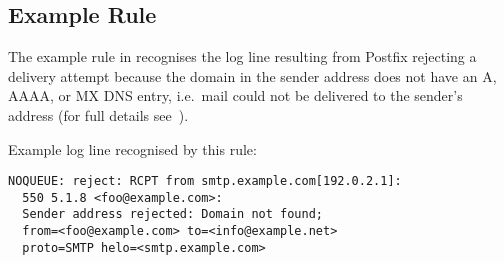 \subsection{Example Rule}

\label{example rule in implementation}

The example rule in 
recognises the log line resulting from Postfix rejecting a delivery attempt
because the domain in the sender address does not have an A, AAAA,
or MX DNS entry, i.e.\ mail could not be delivered to the sender's address
(for full details see~\cite{reject-unknown-sender-domain}).

Example log line recognised by this rule:


\begin{verbatim}
NOQUEUE: reject: RCPT from smtp.example.com[192.0.2.1]:
  550 5.1.8 <foo@example.com>:
  Sender address rejected: Domain not found;
  from=<foo@example.com> to=<info@example.net>
  proto=SMTP helo=<smtp.example.com>
\end{verbatim}

